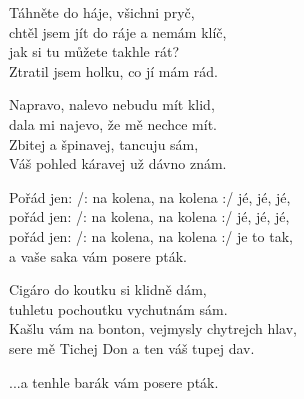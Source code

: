 
\ve{}
Táhněte do háje, všichni pryč,\\
chtěl jsem jít do ráje a nemám klíč,\\ 
jak si tu můžete takhle rát?\\
Ztratil jsem holku, co jí mám rád.
 
\ve{}
Napravo, nalevo nebudu mít klid,\\
dala mi najevo, že mě nechce mít.\\
Zbitej a špinavej, tancuju sám,\\
Váš pohled káravej už dávno znám.
 
\cho{}
Pořád jen: /: na kolena, na kolena :/ jé, jé, jé,\\
pořád jen: /: na kolena, na kolena :/ jé, jé, jé,\\
pořád jen: /: na kolena, na kolena :/ je to tak,\\
a vaše saka vám posere pták.
 
\ve{}
Cigáro do koutku si klidně dám,\\
tuhletu pochoutku vychutnám sám.\\
Kašlu vám na bonton, vejmysly chytrejch hlav,\\
sere mě Tichej Don a ten váš tupej dav.
 
\cho{}
 
\cho{}
...a tenhle barák vám posere pták.

\esong